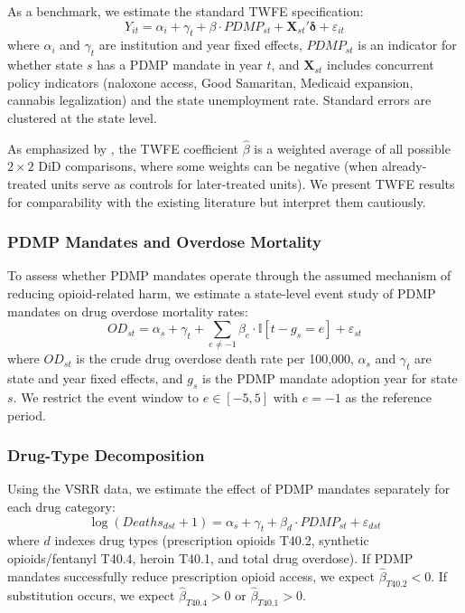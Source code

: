 \documentclass[12pt]{article}
\newcommand{\ind}{\mathbb{I}}
\begin{document}
As a benchmark, we estimate the standard TWFE specification:
\begin{equation}
Y_{it} = \alpha_i + \gamma_t + \beta \cdot PDMP_{st} + \mathbf{X}_{st}'\boldsymbol{\delta} + \varepsilon_{it}
\end{equation}
where $\alpha_i$ and $\gamma_t$ are institution and year fixed effects, $PDMP_{st}$ is an indicator for whether state $s$ has a PDMP mandate in year $t$, and $\mathbf{X}_{st}$ includes concurrent policy indicators (naloxone access, Good Samaritan, Medicaid expansion, cannabis legalization) and the state unemployment rate. Standard errors are clustered at the state level.

As emphasized by \citet{goodman2017difference}, the TWFE coefficient $\hat{\beta}$ is a weighted average of all possible $2 \times 2$ DiD comparisons, where some weights can be negative (when already-treated units serve as controls for later-treated units). We present TWFE results for comparability with the existing literature but interpret them cautiously.

\subsubsection{PDMP Mandates and Overdose Mortality}

To assess whether PDMP mandates operate through the assumed mechanism of reducing opioid-related harm, we estimate a state-level event study of PDMP mandates on drug overdose mortality rates:
\begin{equation}
OD_{st} = \alpha_s + \gamma_t + \sum_{e \neq -1} \beta_e \cdot \ind[t - g_s = e] + \varepsilon_{st}
\end{equation}
where $OD_{st}$ is the crude drug overdose death rate per 100,000, $\alpha_s$ and $\gamma_t$ are state and year fixed effects, and $g_s$ is the PDMP mandate adoption year for state $s$. We restrict the event window to $e \in [-5, 5]$ with $e = -1$ as the reference period.

\subsubsection{Drug-Type Decomposition}

Using the VSRR data, we estimate the effect of PDMP mandates separately for each drug category:
\begin{equation}
\log(Deaths_{dst} + 1) = \alpha_s + \gamma_t + \beta_d \cdot PDMP_{st} + \varepsilon_{dst}
\end{equation}
where $d$ indexes drug types (prescription opioids T40.2, synthetic opioids/fentanyl T40.4, heroin T40.1, and total drug overdose). If PDMP mandates successfully reduce prescription opioid access, we expect $\hat{\beta}_{T40.2} < 0$. If substitution occurs, we expect $\hat{\beta}_{T40.4} > 0$ or $\hat{\beta}_{T40.1} > 0$.
\end{document}
